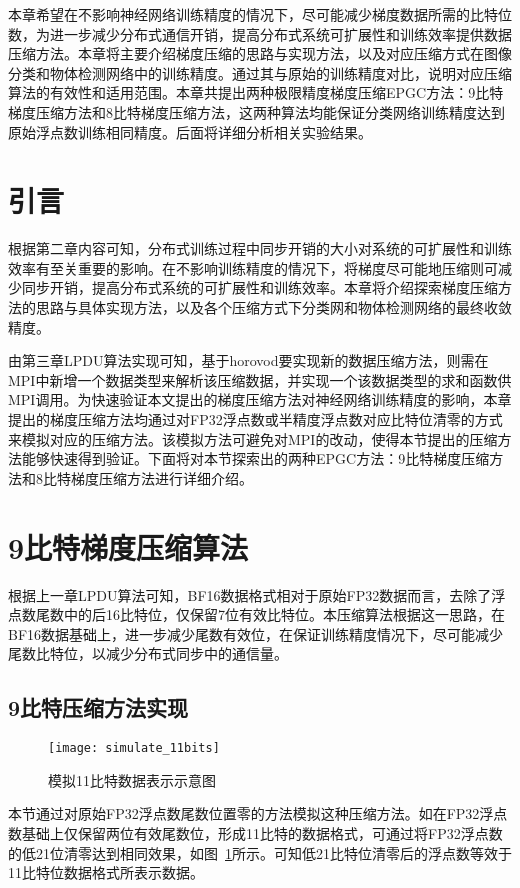 本章希望在不影响神经网络训练精度的情况下，尽可能减少梯度数据所需的比特位数，为进一步减少分布式通信开销，提高分布式系统可扩展性和训练效率提供数据压缩方法。本章将主要介绍梯度压缩的思路与实现方法，以及对应压缩方式在图像分类和物体检测网络中的训练精度。通过其与原始的训练精度对比，说明对应压缩算法的有效性和适用范围。本章共提出两种极限精度梯度压缩EPGC方法：9比特梯度压缩方法和8比特梯度压缩方法，这两种算法均能保证分类网络训练精度达到原始浮点数训练相同精度。后面将详细分析相关实验结果。
\section{引言}
根据第二章内容可知，分布式训练过程中同步开销的大小对系统的可扩展性和训练效率有至关重要的影响。在不影响训练精度的情况下，将梯度尽可能地压缩则可减少同步开销，提高分布式系统的可扩展性和训练效率。本章将介绍探索梯度压缩方法的思路与具体实现方法，以及各个压缩方式下分类网和物体检测网络的最终收敛精度。

由第三章LPDU算法实现可知，基于horovod要实现新的数据压缩方法，则需在MPI中新增一个数据类型来解析该压缩数据，并实现一个该数据类型的求和函数供MPI调用。为快速验证本文提出的梯度压缩方法对神经网络训练精度的影响，本章提出的梯度压缩方法均通过对FP32浮点数或半精度浮点数对应比特位清零的方式来模拟对应的压缩方法。该模拟方法可避免对MPI的改动，使得本节提出的压缩方法能够快速得到验证。下面将对本节探索出的两种EPGC方法：9比特梯度压缩方法和8比特梯度压缩方法进行详细介绍。
\section{9比特梯度压缩算法}
根据上一章LPDU算法可知，BF16数据格式相对于原始FP32数据而言，去除了浮点数尾数中的后16比特位，仅保留7位有效比特位。本压缩算法根据这一思路，在BF16数据基础上，进一步减少尾数有效位，在保证训练精度情况下，尽可能减少尾数比特位，以减少分布式同步中的通信量。

\subsection{9比特压缩方法实现}
\begin{figure}[htp]
\centering
\texttt{[image: simulate\_11bits]}
\caption{模拟11比特数据表示示意图}
\label{fig:simulate_11bits}
\end{figure}
本节通过对原始FP32浮点数尾数位置零的方法模拟这种压缩方法。如在FP32浮点数基础上仅保留两位有效尾数位，形成11比特的数据格式，可通过将FP32浮点数的低21位清零达到相同效果，如图~\ref{fig:simulate_11bits}所示。可知低21比特位清零后的浮点数等效于11比特位数据格式所表示数据。

